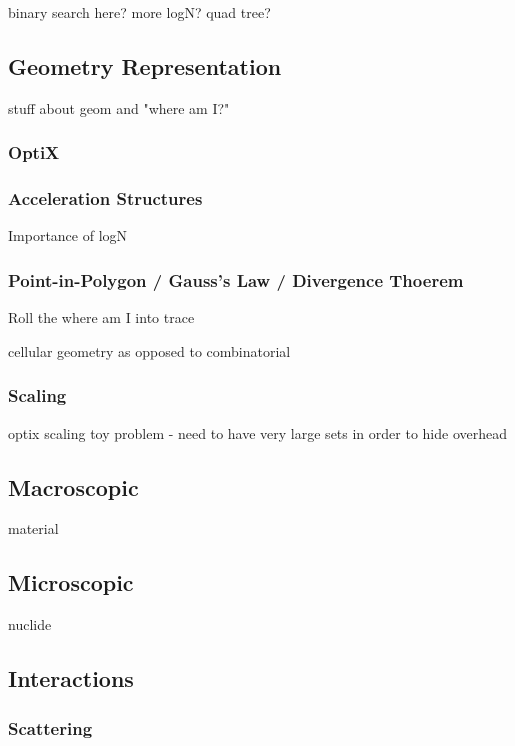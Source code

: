 binary search here? more logN?  quad tree?

\subsection{Geometry Representation}

stuff about geom and "where am I?"

\subsubsection{OptiX}

\subsubsection{Acceleration Structures}

Importance of logN


\subsubsection{Point-in-Polygon / Gauss's Law / Divergence Thoerem}

Roll the where am I into  trace

cellular geometry as opposed to combinatorial


\subsubsection{Scaling}

optix scaling toy problem - need to have very large sets in order to hide overhead


\subsection{Macroscopic}

material

\subsection{Microscopic}

nuclide

\subsection{Interactions}

\subsubsection{Scattering}


